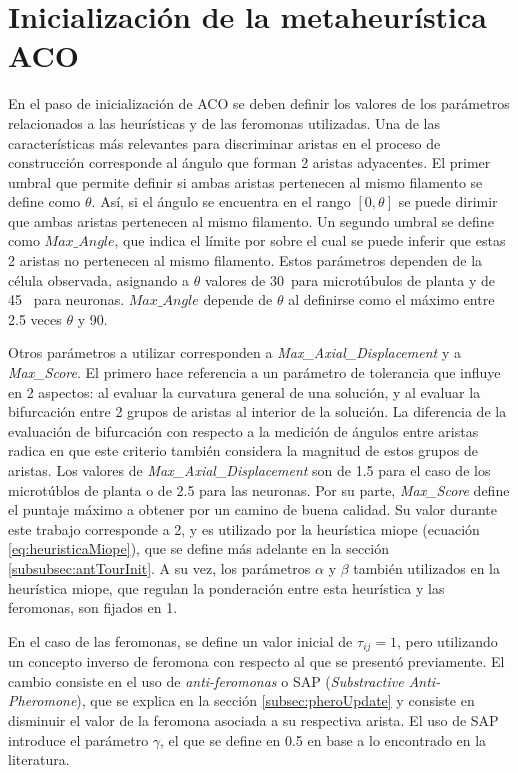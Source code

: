 \section{Inicializaci\'on de la metaheur\'istica ACO}

En el paso de inicializaci\'on de ACO se deben definir los valores de los par\'ametros relacionados a las heur\'isticas y de las feromonas utilizadas. Una de las caracter\'isticas m\'as relevantes para discriminar aristas en el proceso de construcci\'on corresponde al \'angulo que forman 2 aristas adyacentes.
El primer umbral que permite definir si ambas aristas pertenecen al mismo filamento se define como $\theta$. As\'i, si el \'angulo se encuentra en el rango $[0, \theta]$ se puede dirimir que ambas aristas pertenecen al mismo filamento. Un segundo umbral se define como $Max\_Angle$, que indica el l\'imite por sobre el cual se puede inferir que estas 2 aristas no pertenecen al mismo filamento. Estos par\'ametros dependen de la c\'elula observada, asignando a $\theta$ valores de 30\textdegree ~para microt\'ubulos de planta y de 45\textdegree~ para neuronas. $Max\_Angle$ depende de $\theta$ al definirse como el m\'aximo entre 2.5 veces $\theta$ y 90\textdegree.

Otros par\'ametros a utilizar corresponden a {\it Max\_Axial\_Displacement} y a {\it Max\_Score}. El primero hace referencia a un par\'ametro de tolerancia que influye en 2 aspectos: al evaluar la curvatura general de una soluci\'on, y al evaluar la bifurcaci\'on entre 2 grupos de aristas al interior de la soluci\'on. La diferencia de la evaluaci\'on de bifurcaci\'on con respecto a la medici\'on de \'angulos entre aristas radica en que este criterio tambi\'en considera la magnitud de estos grupos de aristas. Los valores de {\it Max\_Axial\_Displacement} son de 1.5 para el caso de los microt\'ublos de planta o de 2.5 para las neuronas. Por su parte, {\it Max\_Score} define el puntaje m\'aximo a obtener por un camino de buena calidad. Su valor durante este trabajo corresponde a 2, y es utilizado por la heur\'istica miope (ecuaci\'on \ref{eq:heuristicaMiope}), que se define m\'as adelante en la secci\'on \ref{subsubsec:antTourInit}. A su vez, los par\'ametros $\alpha$ y $\beta$ tambi\'en utilizados en la heur\'istica miope, que regulan la ponderaci\'on entre esta heur\'istica y las feromonas, son fijados en 1.


En el caso de las feromonas, se define un valor inicial de $\tau_{ij} = 1$, pero utilizando un concepto inverso de feromona con respecto al que se present\'o previamente. El cambio consiste en el uso de {\it anti-feromonas} o SAP ({\it Substractive Anti-Pheromone})\cite{montgomery2002anti}, que se explica en la secci\'on \ref{subsec:pheroUpdate} y consiste en disminuir el valor de la feromona asociada a su respectiva arista. El uso de SAP introduce el par\'ametro $\gamma$, el que se define en 0.5 en base a lo encontrado en la literatura.

